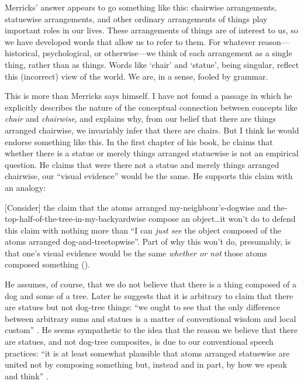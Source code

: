 \documentclass[12pt,twoside]{reedfancy}
\newenvironment{squote}{%
	\begin{spacing}{1}
	\begin{list}{}{%
	\setlength{\labelwidth}{0pt}%
	\rightmargin\leftmargin%
	}
	\item\relax
	}{%
	\end{list}%
	\end{spacing}
	}
\begin{document}
\begin{spacing}{1.25}
Merricks' answer appears to go something like this: chairwise
arrangements, statuewise arrangements, and other ordinary arrangements
of things play important roles in our lives.  These arrangements of
things are of interest to us, so we have developed words that allow us
to refer to them.  For whatever reason---historical, psychological, or
otherwise---we think of each arrangement as a single thing, rather
than as things.  Words like `chair' and `statue', being singular,
reflect this (incorrect) view of the world.  We are, in a sense,
fooled by grammar.

This is more than Merricks says himself.  I have not found a passage
in which he explicitly describes the nature of the conceptual
connection between concepts like {\em chair} and {\em chairwise}, and
explains why, from our belief that there are things arranged
chairwise, we invariably infer that there are chairs.  But I think he
would endorse something like this.  In the first chapter of his book,
he claims that whether there is a statue or merely things arranged
statuewise is not an empirical question.  He claims that were there
not a statue and merely things arranged chairwise, our ``visual
evidence'' would be the same.  He supports this claim with an analogy:

\begin{squote}
{[}Consider{]} the claim that the atoms arranged
my-neighbour's-dogwise and the-top-half-of-the-tree-in-my-backyardwise
compose an object\ldots it won't do to defend this claim with nothing
more than ``I can \emph{just see} the object composed of the atoms
arranged dog-and-treetopwise''. Part of why this won't do, presumably,
is that one's visual evidence would be the same \emph{whether or not}
those atoms composed something (\citeyear[8--9]{merricks2001a}).
\end{squote}

He assumes, of course, that we do not believe that there is a thing
composed of a dog and some of a tree.  Later he suggests that it is
arbitrary to claim that there are statues but not dog-tree things:
``we ought to see that the only difference between arbitrary sums and
statues is a matter of conventional wisdom and local custom''
\citeyearpar[75]{merricks2001a}.  He seems sympathetic to the idea
that the reason we believe that there are statues, and not dog-tree
composites, is due to our conventional speech practices: ``it is at
least somewhat plausible that atoms arranged statuewise are united not
by composing something but, instead and in part, by how we speak and
think'' \citeyearpar[121]{merricks2001a}.


\end{spacing}
\end{document}
